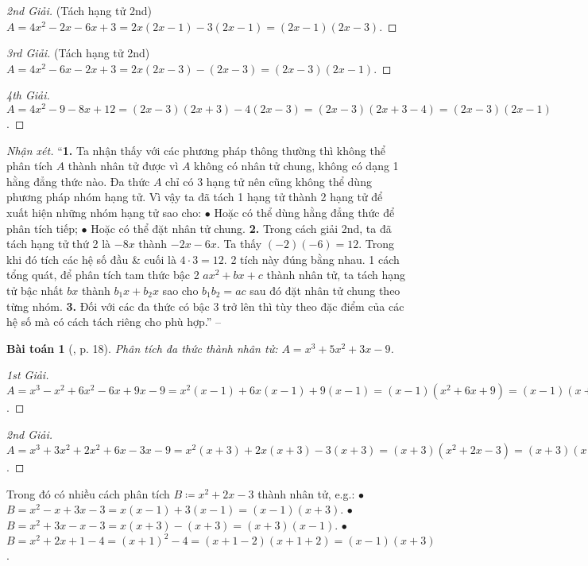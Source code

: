 \documentclass{article}
\numberwithin{equation}{section}
\newtheorem{baitoan}{Bài toán}
\begin{document}
\begin{proof}[2nd Giải]
	(Tách hạng tử 2nd) $A = 4x^2 - 2x - 6x + 3 = 2x(2x - 1) - 3(2x - 1) = (2x - 1)(2x - 3)$.
\end{proof}

\begin{proof}[3rd Giải]
	(Tách hạng tử 2nd) $A = 4x^2 - 6x - 2x + 3 = 2x(2x - 3) - (2x - 3) = (2x - 3)(2x - 1)$.
\end{proof}

\begin{proof}[4th Giải]
	$A = 4x^2 - 9 - 8x + 12 = (2x - 3)(2x + 3) - 4(2x - 3) = (2x - 3)(2x + 3 - 4) = (2x - 3)(2x - 1)$.
\end{proof}
\noindent\textit{Nhận xét.} ``\textbf{1.} Ta nhận thấy với các phương pháp thông thường thì không thể phân tích $A$ thành nhân tử được vì $A$ không có nhân tử chung, không có dạng 1 hằng đẳng thức nào. Đa thức $A$ chỉ có 3 hạng tử nên cũng không thể dùng phương pháp nhóm hạng tử. Vì vậy ta đã tách 1 hạng tử thành 2 hạng tử để xuất hiện những nhóm hạng tử sao cho: $\bullet$ Hoặc có thể dùng hằng đẳng thức để phân tích tiếp; $\bullet$ Hoặc có thể đặt nhân tử chung. \textbf{2.} Trong cách giải 2nd, ta đã tách hạng tử thứ 2 là $-8x$ thành $-2x - 6x$. Ta thấy $(-2)(-6) = 12$. Trong khi đó tích các hệ số đầu \& cuối là $4\cdot3 = 12$. 2 tích này đúng bằng nhau. 1 cách tổng quát, để phân tích tam thức bậc 2 $ax^2 + bx + c$ thành nhân tử, ta tách hạng tử bậc nhất $bx$ thành $b_1x + b_2x$ sao cho $b_1b_2 = ac$ sau đó đặt nhân tử chung theo từng nhóm. \textbf{3.} Đối với các đa thức có bậc 3 trở lên thì tùy theo đặc điểm của các hệ số mà có cách tách riêng cho phù hợp.'' -- \cite[pp. 17--18]{Tuyen_Toan_8}

\begin{baitoan}[\cite{Tuyen_Toan_8}, p. 18]
	Phân tích đa thức thành nhân tử: $A = x^3 + 5x^2 + 3x - 9$.
\end{baitoan}

\begin{proof}[1st Giải]
	$A = x^3 - x^2 + 6x^2 - 6x + 9x - 9 = x^2(x - 1) + 6x(x - 1) + 9(x - 1) = (x - 1)(x^2 + 6x + 9) = (x - 1)(x + 3)^2$.
\end{proof}

\begin{proof}[2nd Giải]
	$A = x^3 + 3x^2 + 2x^2 + 6x - 3x - 9 = x^2(x + 3) + 2x(x + 3) - 3(x + 3) = (x + 3)(x^2 + 2x - 3) = (x + 3)(x - 1)(x + 3) = (x - 1)(x + 3)^2$.
\end{proof}
Trong đó có nhiều cách phân tích $B\coloneqq x^2 + 2x - 3$ thành nhân tử, e.g.: $\bullet$ $B = x^2 - x + 3x - 3 = x(x - 1) + 3(x - 1) = (x - 1)(x + 3)$. $\bullet$ $B = x^2 + 3x - x - 3 = x(x + 3) - (x + 3) = (x + 3)(x - 1)$. $\bullet$ $B = x^2 + 2x + 1 - 4 = (x + 1)^2 - 4 = (x + 1 - 2)(x + 1 + 2) = (x - 1)(x + 3)$.
\end{document}
